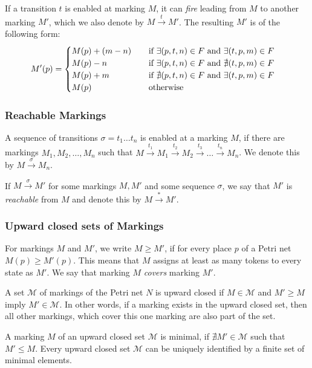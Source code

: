 If a transition $t$ is enabled at marking $M$, it can \emph{fire} leading from $M$ to another marking $M'$, which we also denote by  $M \xrightarrow{t} M'$. 
The resulting $M'$ is of the following form:
\begin{equation*}
M'(p) =  
\begin{cases}
\mathrlap{M(p) + (m - n)}\hphantom{M(p) + (m - n) + 1} \text{ if } \exists (p,t,n) \in F \text{ and } \exists (t,p,m) \in F \\
\mathrlap{M(p) - n}\hphantom{M(p) + (m - n) + 1} \text{ if } \exists (p,t,n) \in F \text{ and } \nexists (t,p,m) \in F \\
\mathrlap{M(p) + m}\hphantom{M(p) + (m - n) + 1} \text{ if }  \nexists (p,t,n) \in F \text{ and } \exists (t,p,m) \in F  \\
\mathrlap{M(p)}\hphantom{M(p) + (m - n) + 1} \text{ otherwise}
\end{cases}
\end{equation*}

\subsubsection{Reachable Markings}
A sequence of transitions $\sigma = t_{1} \dots t_{n}$ is enabled at a marking $M$, if there are markings $M_{1},M_{2},\dots,M_{n}$ such that $M \xrightarrow{t_{1}} M_{1} \xrightarrow{t_{2}} M_{2} \xrightarrow{t_{3}} \dots \xrightarrow{t_{n}} M_{n}$. We denote this by $M \xrightarrow{\sigma} M_{n}$. 

If $M \xrightarrow{\sigma} M'$ for some markings $M,M'$ and some sequence $\sigma$, we say that $M'$ is \emph{reachable} from $M$ and denote this by $M \xrightarrow{*} M'$.


\subsubsection{Upward closed sets of Markings}
For markings $M$ and $M'$, we write $M \ge M'$, if for every place $p$ of a Petri net $M(p) \ge M'(p)$. This means that $M$ assigns at least as many tokens to every state as $M'$. We say that marking $M$ \emph{covers} marking $M'$.


A set $\mathcal{M}$ of markings of the Petri net $N$ is upward closed if $M \in \mathcal{M}$ and $M' \ge M$ imply $M' \in \mathcal{M}$. In other words, if a marking exists in the upward closed set, then all other markings, which cover this one marking are also part of the set.

A marking $M$ of an upward closed set $\mathcal{M}$ is minimal, if $\nexists M' \in \mathcal{M}$ such that $M' \le M$. Every upward closed set $\mathcal{M}$ can be uniquely identified by a finite set of minimal elements. 
